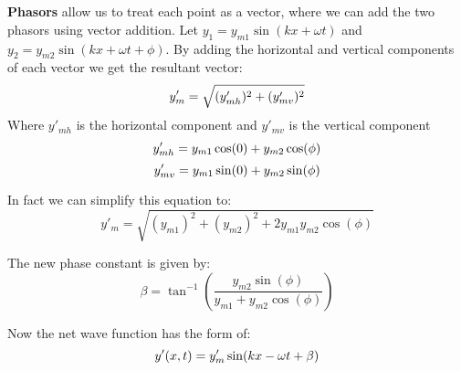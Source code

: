 \documentclass[11pt]{article}
\begin{document}
    \hfill
   \noindent \\ \\ \textbf{Phasors} allow us to treat each point as a vector, where we can
    add the two phasors using vector addition.
    Let $y_1 = y_{m1} \sin(kx + \omega t)$ and $y_2 = y_{m2} \sin(kx + \omega t + \phi)$.
    By adding the horizontal and vertical components of each vector we get the resultant vector:
    \begin{equation}
        y'_{m} = \sqrt{(y'_{mh})^2 + (y'_{mv})^2} \notag
    \end{equation}
    Where  $y'_{mh}$ is the horizontal component and $y'_{mv}$ is the vertical component
    \begin{equation}
        y'_{mh} = y_{m1}\cos(0) + y_{m2}\cos(\phi) \notag
    \end{equation}
    \begin{equation}
        y'_{mv} = y_{m1}\sin(0) + y_{m2}\sin(\phi) \notag
    \end{equation}

    \noindent In fact we can simplify this equation to:
    \begin{equation}
        y'_{m} = \sqrt{(y_{m1})^2 + (y_{m2})^2 + 2y_{m1}y_{m2}\cos(\phi)} \tag{net amplitude}
    \end{equation}
    
    \noindent The new phase constant is given by:
    \begin{equation}
        \beta = \tan^{-1}({\frac{y_{m2}\sin(\phi)}{y_{m1} + y_{m2} \cos(\phi)}}) \tag{net phase constant}
    \end{equation}

    \noindent Now the net wave function has the form of:
    \begin{equation}
        y'(x,t) =  y'_{m}\sin(kx - \omega t + \beta) \notag
    \end{equation}
\end{document}
